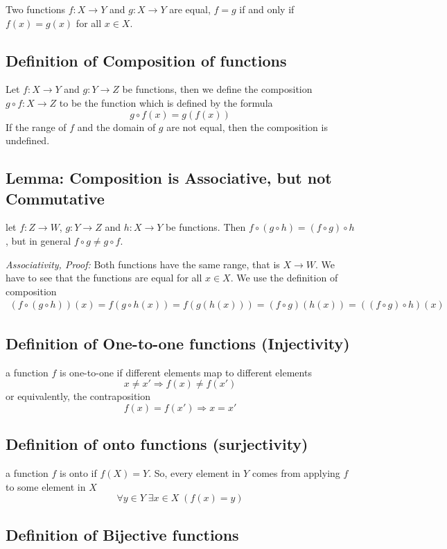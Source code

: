Two functions $f:X\rightarrow Y$ and $g:X\rightarrow Y$ are equal, $f=g$ if and only if $f(x) = g(x)$ for all $x\in X$.

\subsection{Definition of Composition of functions}

Let $f:X\rightarrow Y$ and $g:Y\rightarrow Z$ be functions, then we define the composition $g\circ f:X\rightarrow Z$ to be the function which is defined by the formula
$$
g\circ f(x) = g(f(x))
$$
If the range of $f$ and the domain of $g$ are not equal, then the composition is undefined.

\subsection{Lemma: Composition is Associative, but not Commutative}

let $f:Z\rightarrow W$, $g:Y\rightarrow Z$ and $h:X\rightarrow Y$ be functions. Then 
$f\circ(g\circ h) = (f\circ g)\circ h$, but in general $f\circ g \neq g\circ f$.

\textit{Associativity, Proof: } Both functions have the same range, that is $X\rightarrow W$. We have to see that the functions are equal for all $x\in X$. We use the definition of composition
\begin{gather*}
	(f\circ(g\circ h))(x) = f(g\circ h(x)) = f(g(h(x))) = (f\circ g)(h(x)) = ((f\circ g)\circ h)(x) 
\end{gather*}

\subsection{Definition of One-to-one functions (Injectivity)}
a function $f$ is one-to-one if different elements map to different elements
$$
x\neq x' \Rightarrow f(x)\neq f(x')
$$
or equivalently, the contraposition
$$
f(x) = f(x') \Rightarrow x = x'
$$

\subsection{Definition of onto functions (surjectivity)}
a function $f$ is onto if $f(X) = Y$. So, every element in $Y$ comes from applying $f$ to some element in $X$
$$
\forall y\in Y \;\exists x\in X\;(f(x) = y)
$$

\subsection{Definition of Bijective functions}

